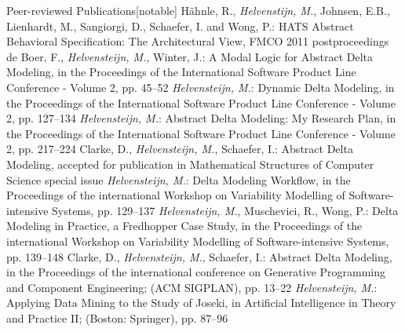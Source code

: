 
\begin{rubric}{Peer-reviewed Publications}[notable]
		H\"ahnle, R., \emph{Helvenstijn, M.}, Johnsen, E.B.,
			Lienhardt, M., Sangiorgi, D., Schaefer, I. and Wong, P.:
		HATS Abstract Behavioral Specification: The Architectural View,
		FMCO 2011 postproceedings
		\hfill{}
		de Boer, F., \emph{Helvensteijn, M.}, Winter, J.:
		A Modal Logic for Abstract Delta Modeling,
		in the Proceedings of the  International Software Product Line Conference
			- Volume 2, pp. 45--52
		\hfill{}
		\emph{Helvensteijn, M.}:
		Dynamic Delta Modeling,
		in the Proceedings of the  International Software Product Line Conference
			- Volume 2, pp. 127--134
		\hfill{}
		\emph{Helvensteijn, M.}:
		Abstract Delta Modeling: My Research Plan,
		in the Proceedings of the  International Software Product Line Conference
			- Volume 2, pp. 217--224
		\hfill{}
		Clarke, D., \emph{Helvensteijn, M.}, Schaefer, I.:
		Abstract Delta Modeling,
		accepted for publication in Mathematical Structures of Computer Science special issue
		\hfill\emptydoi
		\emph{Helvensteijn, M.}:
		Delta Modeling Workflow,
		in the Proceedings of the  international Workshop on
			Variability Modelling of Software-intensive Systems, pp. 129--137
		\hfill{}
		\emph{Helvensteijn, M.}, Muschevici, R., Wong, P.:
		Delta Modeling in Practice, a Fredhopper Case Study,
		in the Proceedings of the  international Workshop on
			Variability Modelling of Software-intensive Systems, pp. 139--148
		\hfill{}
		Clarke, D., \emph{Helvensteijn, M.}, Schaefer, I.:
		Abstract Delta Modeling,
		in the Proceedings of the  international conference on Generative
			Programming and Component Engineering; (ACM SIGPLAN), pp. 13--22
		\hfill{}
		\emph{Helvensteijn, M.}:
		Applying Data Mining to the Study of Joseki,
		in Artificial Intelligence in Theory and Practice II; (Boston: Springer), pp. 87--96
		\hfill{}
\end{rubric}
